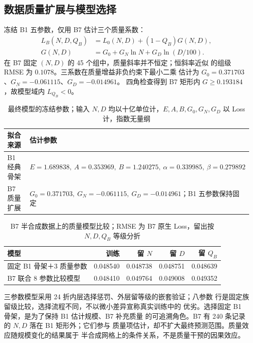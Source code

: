 \subsection{数据质量扩展与模型选择}

冻结 B1 五参数，仅用 B7 估计三个质量系数：
\begin{align}\label{eq:cyj-b7}
L_B(N,D,Q_B)&=L_0(N,D)+(1-Q_B)G(N,D),\\
G(N,D)&=G_0+G_N\ln N+G_D\ln(D/100).
\end{align}
在 B7 固定 $(N,D)$ 的 45 个组中，质量斜率并不恒定；恒斜率近似
的组级 RMSE 为 $0.1078$。三系数在质量增益非负约束下最小二乘
估计为 $G_0=0.371703$、$G_N=-0.061115$、$G_D=-0.014961$。
四角检查得到 B7 矩形内 $G\geq0.193184$，故模型域内 $L_{Q_B}<0$。

\begin{table}[htbp]
\centering\small
\caption{最终模型的冻结参数；输入 $N,D$ 均以十亿单位计，$E,A,B,G_0,G_N,G_D$ 以 Loss 计，指数无量纲}
\label{tab:cyj-q2-parameters}
\begin{tabular}{p{}p{}}
\hline
拟合来源 & 估计参数\\ \hline
B1 经典骨架 & $E=1.689838,\ A=0.353969,\ B=1.240275,\ \alpha=0.339985,\ \beta=0.279892$\\
B7 质量扩展 & $G_0=0.371703,\ G_N=-0.061115,\ G_D=-0.014961$；B1 五参数保持固定\\ \hline
\end{tabular}
\end{table}

\begin{table}[htbp]
\centering\small
\caption{B7 半合成数据上的质量模型比较；RMSE 为 B7 原生 Loss，留出按 $N,D,Q_B$ 等级分折}
\label{tab:cyj-q2-quality}
\begin{tabular}{p{}rrrr}
\hline
模型 & 训练 & 留 $N$ & 留 $D$ & 留 $Q_B$\\ \hline
固定 B1 骨架＋3 质量参数 & 0.048540 & 0.048738 & 0.048751 & 0.048639\\
B7 联合 8 参数比较模型 & 0.048410 & 0.049764 & 0.049008 & 0.049352\\ \hline
\end{tabular}
\end{table}

三参数模型采用 24 折内层选择惩罚、外层留等级的嵌套验证；八参数
行是固定族留级比较，选择流程不同，不以微小差异宣称真实训练中的
优劣。选择固定 B1 骨架，是为了保持 B1 估计规模、B7 补充质量
的可追溯角色。B7 有 240 条记录的 $N,D$ 落在 B1 矩形外；它们参与
质量项估计，却不扩大最终预测范围。质量效应随规模变化的结果属于
半合成网格上的条件关系，不是质量干预的因果效应。


